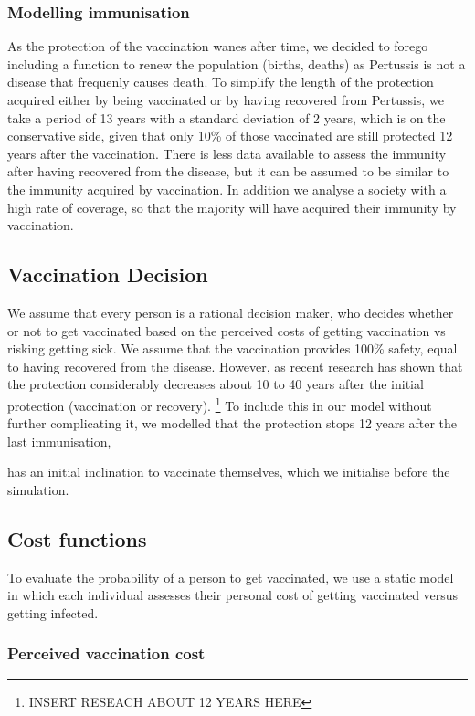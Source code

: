 \documentclass[11pt]{article}
\begin{document}
\subsubsection{Modelling immunisation}
As the protection of the vaccination wanes after time, we decided to forego including a function to renew the population (births, deaths) as Pertussis is not a disease that frequenly causes death. 
To simplify the length of the protection acquired either by being vaccinated or by having recovered from Pertussis, we take a period of 13 years with a standard deviation of 2 years, which is on the conservative side, given that only 10\% of those vaccinated are still protected 12 years after the vaccination. There is less data available to assess the immunity after having recovered from the disease, but it can be assumed to be similar to the immunity acquired by vaccination. In addition we analyse a society with a high rate of coverage, so that the majority will have acquired their immunity by vaccination. 

\subsection{Vaccination Decision}

We assume that every person is a rational decision maker, who decides whether or not to get vaccinated based on the perceived costs of getting vaccination vs risking getting sick. We assume that the vaccination provides 100\% safety, equal to having recovered from the disease. However, as recent research has shown that the protection considerably decreases about 10 to 40 years after the initial protection (vaccination or recovery). \footnote{INSERT RESEACH ABOUT 12 YEARS HERE} To include this in our model without further complicating it, we modelled that the protection stops 12 years after the last immunisation, 

has an initial inclination to vaccinate themselves, which we initialise before the simulation. 

\subsection{Cost functions}
To evaluate the probability of a person to get vaccinated, we use a static model in which each individual assesses their personal cost of getting vaccinated versus getting infected. 


\subsubsection{Perceived vaccination cost} 
\end{document}

